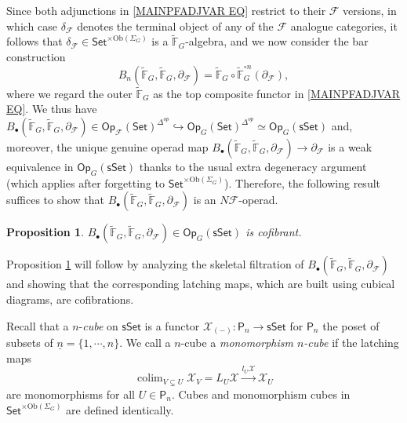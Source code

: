 \documentclass[a4paper,10pt
,draft
]{article}%
\numberwithin{equation}{section}
\numberwithin{figure}{section}
\newtheorem{proposition}[equation]{Proposition}%
\theoremstyle{definition} %
\DeclareMathOperator{\colim}{colim}%
\newcommand{\1}{\ensuremath{\mathbbm 1}}%
\begin{document}
Since both adjunctions in 
\eqref{MAINPFADJVAR EQ}
restrict to their $\mathcal{F}$ versions,
in which case $\delta_{\mathcal{F}}$ denotes the terminal object of any of the $\mathcal{F}$ analogue categories,
it follows that 
$\delta_{\mathcal{F}} \in \mathsf{Set}^{\times \text{Ob}(\Sigma_G)}$
is a 
$\widetilde{\mathbb{F}}_G$-algebra, 
and we now consider the bar construction
\[B_n(\widetilde{\mathbb{F}}_G,
\widetilde{\mathbb{F}}_G,
\partial_{\mathcal{F}})
= \widetilde{\mathbb{F}}_G \circ
\widetilde{\mathbb{F}}_G ^{\circ n} 
(\partial_{\mathcal{F}}),
\]
where we regard the outer $\widetilde{\mathbb{F}}_G$ as the top composite functor in \eqref{MAINPFADJVAR EQ}.
We thus have
$B_{\bullet}(\widetilde{\mathbb{F}}_G,
\widetilde{\mathbb{F}}_G,
\partial_{\mathcal{F}})
\in
\mathsf{Op}_{\mathcal{F}}(\mathsf{Set})^{\Delta^{op}}
	\hookrightarrow
\mathsf{Op}_G(\mathsf{Set})^{\Delta^{op}}
\simeq \mathsf{Op}_G(\mathsf{sSet})$
and, moreover, the unique genuine operad map
$B_{\bullet}(\widetilde{\mathbb{F}}_G,
\widetilde{\mathbb{F}}_G,
\partial_{\mathcal{F}})
\to 
\partial_{\mathcal{F}}$
is a weak equivalence in 
$\mathsf{Op}_G(\mathsf{sSet})$
thanks to the usual extra degeneracy argument
\cite[\S 4.5]{Ri14}
(which applies after forgetting to 
$\mathsf{Set}^{\times \text{Ob}(\Sigma_G)}$).
Therefore, 
the following result suffices to show that
$B_{\bullet}(\widetilde{\mathbb{F}}_G,
\widetilde{\mathbb{F}}_G,
\partial_{\mathcal{F}})
$
is an $N \mathcal{F}$-operad.

\begin{proposition}\label{BARCOF PROP}
$B_{\bullet}(\widetilde{\mathbb{F}}_G,
\widetilde{\mathbb{F}}_G,
\partial_{\mathcal{F}})
\in \mathsf{Op}_G(\mathsf{sSet})
$
is cofibrant.
\end{proposition}

Proposition \ref{BARCOF PROP}
will follow by analyzing the skeletal filtration of
$B_{\bullet}(\widetilde{\mathbb{F}}_G,
\widetilde{\mathbb{F}}_G,
\partial_{\mathcal{F}})
$ and showing that the corresponding latching maps,
which are built using cubical diagrams, are cofibrations.

Recall that a $n$-\textit{cube} on $\mathsf{sSet}$
is a functor
$\mathcal{X}_{(\minus)} \colon \mathsf{P}_n \to 
\mathsf{sSet}$
for $\mathsf{P}_n$ the poset of subsets of 
$\underline{n} = \{1,\cdots,n\}$.
We call a $n$-cube a \textit{monomorphism $n$-cube}
if the latching maps
\[
\colim_{V \subsetneq U} \mathcal{X}_V = L_U \mathcal{X}
\xrightarrow{l_U \mathcal{X}} 
\mathcal{X}_U
\]
are monomorphisms for all $U \in \mathsf{P}_n$.
Cubes and monomorphism cubes in
$\mathsf{Set}^{\times \text{Ob}(\Sigma_G)}$
are defined identically.
\end{document}
